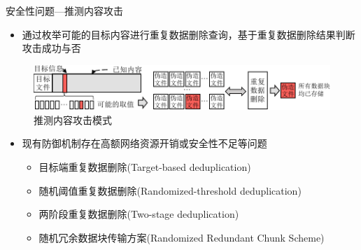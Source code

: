 \documentclass{beamer}
\begin{document}
\begin{frame}{安全性问题—推测内容攻击}
    \begin{itemize}
        \item 通过枚举可能的目标内容进行重复数据删除查询，基于重复数据删除结果判断攻击成功与否
    \end{itemize}
    \begin{figure}[!htb]
        \small
        \centering
        \includegraphics[width=\textwidth]{./pic/LRI.pdf}
        \caption{推测内容攻击模式}
        \label{fig:LRI-mode}
    \end{figure}
    \vspace{-1em}
    \begin{itemize}
        \item 现有防御机制存在高额网络资源开销或安全性不足等问题
              \begin{itemize}
                  \item 目标端重复数据删除(Target-based deduplication)
                  \item 随机阈值重复数据删除(Randomized-threshold deduplication)
                  \item 两阶段重复数据删除(Two-stage deduplication)
                  \item 随机冗余数据块传输方案(Randomized Redundant Chunk Scheme)
              \end{itemize}
    \end{itemize}
\end{frame}
\end{document}
